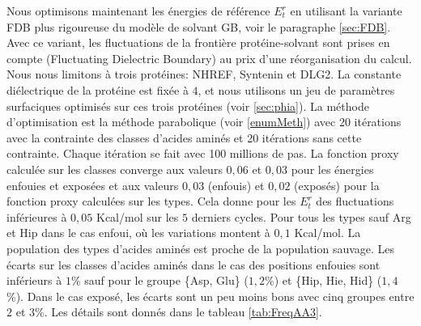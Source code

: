 Nous optimisons maintenant les énergies de référence $E_t^r$ en utilisant la variante FDB plus rigoureuse du modèle de solvant GB, voir le paragraphe \ref{sec:FDB}. Avec ce variant, les fluctuations de la frontière protéine-solvant sont prises en compte (\og Fluctuating Dielectric Boundary\fg) au prix d'une réorganisation du calcul. Nous nous limitons à trois protéines: NHREF, Syntenin et DLG2. La constante diélectrique de la protéine est fixée à $4$, et nous utilisons un jeu de paramètres surfaciques optimisés sur ces trois protéines (voir \ref{sec:phia}). La méthode d'optimisation est la méthode parabolique (voir \ref{enumMeth}) avec 20 itérations avec la contrainte des classes d'acides aminés et 20 itérations sans cette contrainte. Chaque itération se fait avec 100 millions de pas. La fonction proxy calculée sur les classes converge aux valeurs $0,06$ et $0,03$ pour les énergies enfouies et exposées et aux valeurs $0,03$ (enfouis) et $0,02$ (exposés) pour la fonction proxy calculées sur les types. Cela donne pour les $E_t^r$ des fluctuations inférieures à $0,05$ Kcal/mol sur les $5$ derniers cycles. Pour tous les types sauf Arg et Hip dans le cas enfoui, où les variations montent à $0,1$ Kcal/mol. La population des types d'acides aminés est proche de la population sauvage. Les écarts sur les classes d'acides aminés dans le cas des positions enfouies sont inférieurs à $1$\%  sauf pour le groupe \{Asp, Glu\} ($1,2$\%)  et \{Hip, Hie, Hid\} ($1,4$\%). Dans le cas exposé, les écarts sont un peu moins bons avec cinq groupes entre $2$ et $3$\%. Les détails sont donnés dans le tableau \ref{tab:FreqAA3}.


